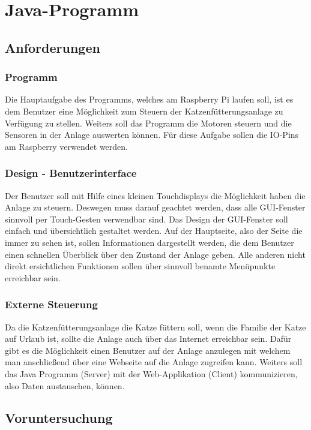 
\chapter{Java-Programm}
\label{sec:java-programm}

\section{Anforderungen}
\subsection{Programm}
Die Hauptaufgabe des Programms, welches am Raspberry Pi laufen soll, ist es dem Benutzer eine Möglichkeit zum Steuern der Katzenfütterungsanlage zu Verfügung zu stellen. Weiters soll das Programm die Motoren steuern und die Sensoren in der Anlage auswerten können. Für diese Aufgabe sollen die IO-Pins am Raspberry verwendet werden.
\subsection{Design - Benutzerinterface}
Der Benutzer soll mit Hilfe eines kleinen Touchdisplays die Möglichkeit haben die Anlage zu steuern. Deswegen muss darauf geachtet werden, dass alle GUI-Fenster sinnvoll per Touch-Gesten verwendbar sind.
Das Design der GUI-Fenster soll einfach und übersichtlich gestaltet werden. Auf der Hauptseite, also der Seite die immer zu sehen ist, sollen Informationen dargestellt werden, die dem Benutzer einen schnellen Überblick über den Zustand der Anlage geben. Alle anderen nicht direkt ersichtlichen Funktionen sollen über sinnvoll benamte Menüpunkte erreichbar sein.
\subsection{Externe Steuerung}
Da die Katzenfütterungsanlage die Katze füttern soll, wenn die Familie der Katze auf Urlaub ist, sollte die Anlage auch über das Internet erreichbar sein. Dafür gibt es die Möglichkeit einen Benutzer auf der Anlage anzulegen mit welchem man anschließend über eine Webseite auf die Anlage zugreifen kann. Weiters soll das Java Programm (Server) mit der Web-Applikation (Client) kommunizieren, also Daten austauschen, können.

\newpage

\section{Voruntersuchung}
